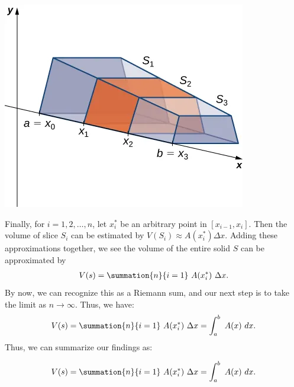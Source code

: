\documentclass{report}
\begin{document}
    \bigbreak \noindent 
    \begin{center}
        \includegraphics[scale=0.6]{./figures/graph10.png}
    \end{center}
    \pagebreak \bigbreak \noindent 
    Finally, for \( i = 1, 2, \ldots, n \),
    let \( x^*_i \) be an arbitrary point in \([x_{i-1}, x_i]\).
    Then the volume of slice \( S_i \)
    can be estimated by \( V(S_i) \approx A(x^*_i) \Delta x \).
    Adding these approximations together, we see the volume of the entire solid \( S \)
    can be approximated by
    \begin{align*}
        V(s) = \summation{n}{i=1}\ A(x_{i}^{*})\ \Delta x 
    .\end{align*}
    \bigbreak \noindent 
    By now, we can recognize this as a Riemann sum, and our next step is to take the limit as  $n \rightarrow \infty$. Thus, we have:
    \begin{align*}
        V(s) = \summation{n}{i=1}\ A(x_{i}^{*})\ \Delta x  = \int_{a}^{b}\ A(x)\ dx
    .\end{align*}
    \bigbreak \noindent 
    Thus, we can summarize our findings as:
    \begin{thrm}
        \begin{align*}
            V(s) = \summation{n}{i=1}\ A(x_{i}^{*})\ \Delta x  = \int_{a}^{b}\ A(x)\ dx
        .\end{align*}
    \end{thrm}
    
\end{document}
